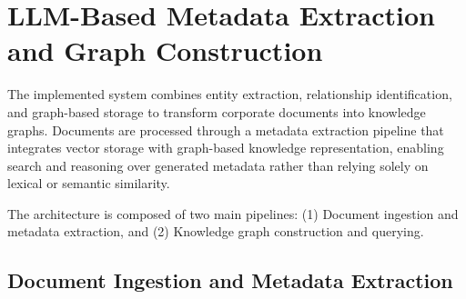 \section{LLM-Based Metadata Extraction and Graph Construction}\label{sec:metadata_extraction}
The implemented system combines entity extraction, relationship identification, and graph-based storage to transform corporate documents into knowledge graphs. Documents are processed through a metadata extraction pipeline that integrates vector storage with graph-based knowledge representation, enabling search and reasoning over generated metadata rather than relying solely on lexical or semantic similarity.

The architecture is composed of two main pipelines:  
(1) Document ingestion and metadata extraction, and  
(2) Knowledge graph construction and querying.

\subsection{Document Ingestion and Metadata Extraction}

